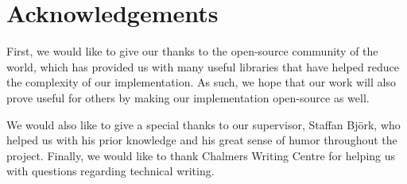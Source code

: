 \chapter*{Acknowledgements}

First, we would like to give our thanks to the open-source community of the world, which has provided us with many useful libraries that have helped reduce the complexity of our implementation.
As such, we hope that our work will also prove useful for others by making our implementation open-source as well.

We would also like to give a special thanks to our supervisor, Staffan Björk, who helped us with his prior knowledge and his great sense of humor throughout the project.
Finally, we would like to thank Chalmers Writing Centre for helping us with questions regarding technical writing.
